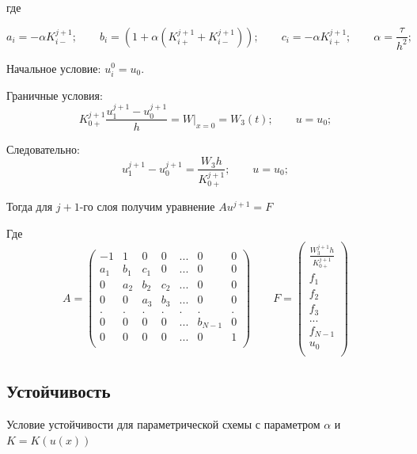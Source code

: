 \documentclass[titlepage,12pt]{article}
\begin{document}
где

\begin{displaymath}
a_i = -\alpha{K_{i-}^{j+1}};   \qquad
b_i = (1 + \alpha{(K_{i+}^{j+1} + K_{i-}^{j+1})});   \qquad
c_i = - \alpha{K_{i+}^{j+1}};   \qquad
\alpha = \frac{\tau}{h^2};
\end{displaymath}

Начальное условие: \(u_i^0 = u_0\).

Граничные условия:
\begin{equation}
K_{0+}^{j+1}\frac{u_1^{j+1} - u_0^{j+1}}{h} = W|_{x=0} = W_3(t);  \qquad
u = u_0;
\end{equation}

Следовательно:
\begin{equation}
u_1^{j+1} - u_0^{j+1} = \frac{W_3h}{K_{0+}^{j+1}};   \qquad
u = u_0;
\end{equation}

Тогда для \(j+1\)-го слоя получим уравнение \(Au^{j+1} = F\)

Где
\begin{displaymath}
 A = \left( \begin{array}{ccccccc}
-1 & 1 & 0 & 0 & ... & 0 & 0 \\
a_1 & b_1 & c_1 & 0 & ... & 0 & 0 \\
0 & a_2 & b_2 & c_2 & ... & 0 & 0 \\
0 & 0 & a_3 & b_3 & ... & 0 & 0 \\
. & . & . & . & . & . & . \\
0 & 0 & 0 & 0 & ... & b_{N-1} & 0 \\
0 & 0 & 0 & 0 & ... & 0 & 1 \\
\end{array}
\right)  \qquad
 F = \left( \begin{array}{c}
\frac{W_3^{j+1}h}{K_{0+}^{j+1}}  \\
f_1 \\
f_2 \\
f_3 \\
... \\
f_{N-1} \\
u_0  \\
\end{array}
\right) 
\end{displaymath}

\subsection{Устойчивость}
Условие устойчивости для параметрической схемы с параметром $\alpha$  и \(K = K(u(x))\)
\end{document}
